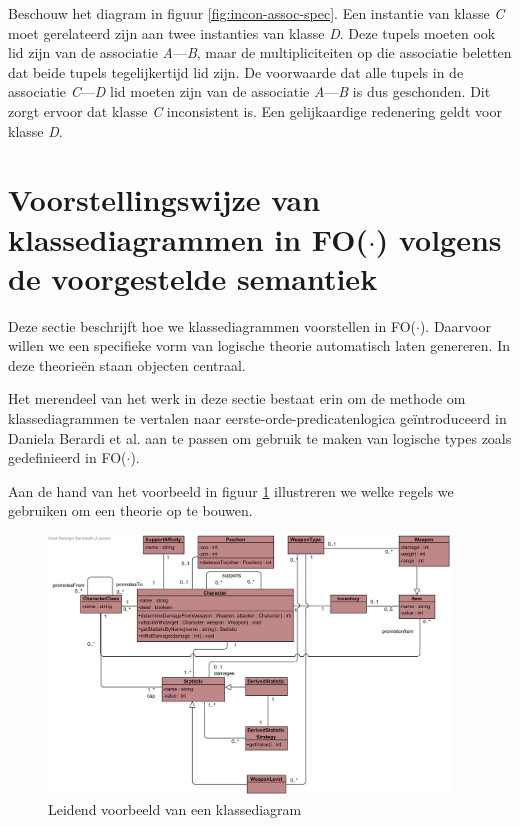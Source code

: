 Beschouw het diagram in figuur \ref{fig:incon-assoc-spec}. Een instantie van klasse \textit{C} moet gerelateerd zijn aan twee instanties van klasse \textit{D}. Deze tupels moeten ook lid zijn van de associatie \textit{A}---\textit{B}, maar de multipliciteiten op die associatie beletten dat beide tupels tegelijkertijd lid zijn. De voorwaarde dat alle tupels in de associatie \textit{C}---\textit{D} lid moeten zijn van de associatie \textit{A}---\textit{B} is dus geschonden. Dit zorgt ervoor dat klasse \textit{C} inconsistent is. Een gelijkaardige redenering geldt voor klasse \textit{D}.

\section{Voorstellingswijze van klassediagrammen in FO($\cdot$) volgens de voorgestelde semantiek}\label{sec:cd-rep-cons}

Deze sectie beschrijft hoe we klassediagrammen voorstellen in FO($\cdot$). Daarvoor willen we een specifieke vorm van logische theorie automatisch laten genereren. In deze theorie\"en staan objecten centraal. 

Het merendeel van het werk in deze sectie bestaat erin om de methode om klassediagrammen te vertalen naar eerste-orde-predicatenlogica ge\"introduceerd in Daniela Berardi et al.\cite{BerardiDaniela2005RoUc} aan te passen om gebruik te maken van logische types zoals gedefinieerd in FO($\cdot$).

Aan de hand van het voorbeeld in figuur \ref{fig:diagram-voorbeeld} illustreren we welke regels we gebruiken om een theorie op te bouwen.

\begin{figure}[h]
	\includegraphics[width=0.95\textwidth]{chap-consistentie/diagram-voorbeeld.png}
	\caption{Leidend voorbeeld van een klassediagram}
	\label{fig:diagram-voorbeeld}
\end{figure}

